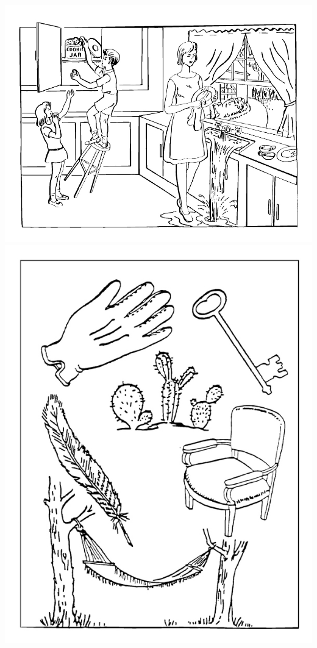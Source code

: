 \documentclass[8pt]{extarticle}
\begin{document}
\includegraphics[height=\textwidth, angle=90]{nihss_1.jpg}
\newpage
\includegraphics[width=\textwidth]{nihss_3.jpg}
\end{document}
